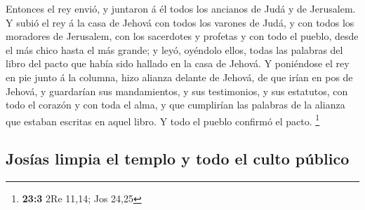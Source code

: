  Entonces el rey envió, y juntaron á él todos los ancianos
de Judá y de Jerusalem.  Y subió el rey á la casa de
Jehová con todos los varones de Judá, y con todos los moradores de
Jerusalem, con los sacerdotes y profetas y con todo el pueblo, desde el
más chico hasta el más grande; y leyó, oyéndolo ellos, todas las
palabras del libro del pacto que había sido hallado en la casa de
Jehová.  Y poniéndose el rey en pie junto á la columna,
hizo alianza delante de Jehová, de que irían en pos de Jehová, y
guardarían sus mandamientos, y sus testimonios, y sus estatutos, con
todo el corazón y con toda el alma, y que cumplirían las palabras de la
alianza que estaban escritas en aquel libro. Y todo el pueblo confirmó
el pacto. \footnote{\textbf{23:3} 2Re 11,14; Jos 24,25}

\hypertarget{josuxedas-limpia-el-templo-y-todo-el-culto-puxfablico}{%
\subsection{Josías limpia el templo y todo el culto
público}\label{josuxedas-limpia-el-templo-y-todo-el-culto-puxfablico}}

